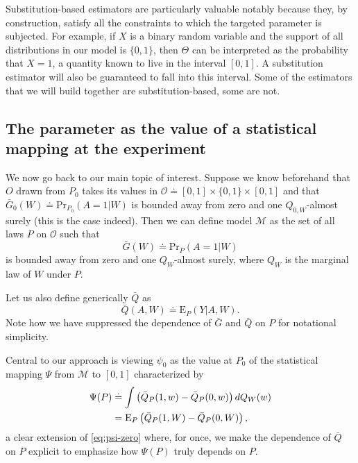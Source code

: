 \documentclass[
  11pt,
  openright,twoside]{book}
\newcommand{\defq}{\doteq}
\newcommand{\calM}{\mathcal{M}}
\newcommand{\calO}{\mathcal{O}}
\newcommand{\Exp}{\textrm{E}}
\newcommand{\Gbar}{\bar{G}}
\renewcommand{\Pr}{\textrm{Pr}}
\newcommand{\Qbar}{\bar{Q}}
\theoremstyle{definition}
\theoremstyle{definition}
\theoremstyle{definition}
\theoremstyle{definition}
\theoremstyle{remark}
\begin{document}
Substitution-based estimators are particularly valuable notably because they,
by construction, satisfy all the constraints to which the targeted parameter
is subjected. For example, if \(X\) is a binary random variable and the support
of all distributions in our model is \(\{0,1\}\), then \(\Theta\) can be
interpreted as the probability that \(X = 1\), a quantity known to live in the
interval \([0,1]\). A substitution estimator will also be guaranteed to fall
into this interval. Some of the estimators that we will build together are
substitution-based, some are not.

\hypertarget{parameter-mapping}{%
\subsection{The parameter as the value of a statistical mapping at the experiment}\label{parameter-mapping}}

We now go back to our main topic of interest. Suppose we know beforehand that
\(O\) drawn from \(P_{0}\) takes its values in \(\calO \defq [0,1] \times \{0,1\} \times [0,1]\) and that \(\Gbar_{0}(W) \defq \Pr_{P_{0}}(A=1|W)\) is bounded away from
zero and one \(Q_{0,W}\)-almost surely (this is the case indeed). Then we can
define model \(\calM\) as the set of all laws \(P\) on \(\calO\) such that
\begin{equation*}\Gbar(W)  \defq \Pr_{P}(A=1|W)\end{equation*} is bounded away
from zero and one \(Q_{W}\)-almost surely, where \(Q_{W}\) is the marginal law of
\(W\) under \(P\).

Let us also define generically \(\Qbar\) as \begin{equation*}\Qbar (A,W) \defq
\Exp_{P} (Y|A, W).\end{equation*} Note how we have suppressed the dependence
of \(\Gbar\) and \(\Qbar\) on \(P\) for notational simplicity.

Central to our approach is viewing \(\psi_{0}\) as the value at \(P_{0}\) of the
statistical mapping \(\Psi\) from \(\calM\) to \([0,1]\) characterized by
\begin{align}  \Psi(P)  &\defq  \int  \left(\Qbar_P(1,  w)  -  \Qbar_P(0,
w)\right)  dQ_{W}(w)   \label{eq:psimap}\\  &=  \Exp_{P}  \left(\Qbar_P(1,   W)  -
\Qbar_P(0,   W)\right),    \notag   \end{align} a clear extension of
\eqref{eq:psi-zero} where, for once, we make the dependence of \(\Qbar\) on \(P\)
explicit to emphasize how \(\Psi(P)\) truly depends on \(P\).
\end{document}
